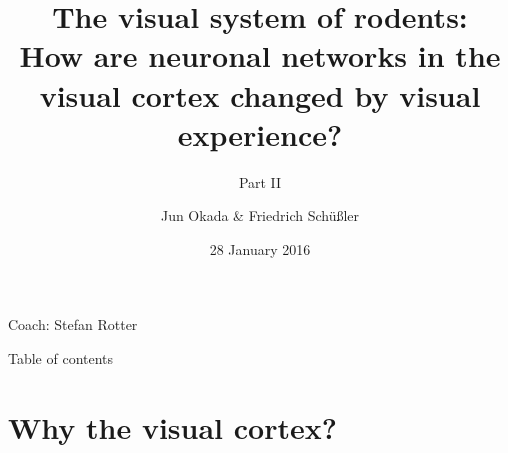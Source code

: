\documentclass[xcolor=x11names,compress]{beamer}
\renewcommand{\(}{\begin{columns}}
\renewcommand{\)}{\end{columns}}
\newcommand{\<}[1]{\begin{column}{#1}}
\renewcommand{\>}{\end{column}}
\begin{document}
\begin{frame}{}
\title[FM]{The  visual  system  of  rodents: \\
How are neuronal    networks    in  the visual cortex  changed by  visual  experience?}
\subtitle{Part II}
\author{
Jun Okada \& Friedrich Schüßler}
\date{\normalsize 28 January 2016}
\titlepage

\centering 
Coach: Stefan Rotter
\end{frame}

\begin{frame}{Table of contents}
    \tableofcontents
\end{frame}


\section{Why the visual cortex?}
\label{sec:why_the_visual_cortex_}
\end{document}
